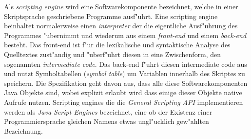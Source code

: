 Als \emph{scripting engine} wird eine Softwarekomponente bezeichnet, welche in einer Skriptsprache geschriebene Programme ausf"uhrt.
Eine scripting engine beinhaltet normalerweise einen \emph{interpreter} der die eigentliche Ausf"uhrung des Programmes "ubernimmt und
wiederum aus einem \emph{front-end} und einem \emph{back-end} besteht. Das front-end ist f"ur die lexikalische und syntaktische
Analyse des Quelltextes zust"andig und "uberf"uhrt diesen in eine Zwischenform, den sogenannten \emph{intermediate code}.
Das back-end f"uhrt diesen intermediate code aus und nutzt Symboltabellen (\emph{symbol table}) um Variablen innerhalb des Skriptes
zu speichern. Die Spezifikation geht davon aus, dass alle diese Softwarekomponenten Java Objekte sind, wobei explizit erlaubt wird
dass einige dieser Objekte native Aufrufe nutzen. Scripting engines die die \emph{General Scripting API} implementieren werden als 
\emph{Java Script Engines} bezeichnet, eine ob der Existenz einer Programmiersprache gleichen Namens etwas ungl"ucklich gew"ahlten 
Bezeichnung.

